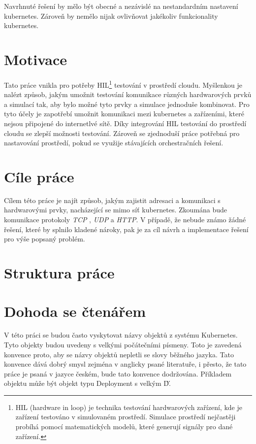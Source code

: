 Navrhnuté řešení by mělo být obecné a nezávislé na nestandardním nastavení kubernetes. Zároveň by nemělo nijak ovlivňovat jakékoliv funkcionality kubernetes. 

\newpage

\section{Motivace}
Tato práce vnikla pro potřeby HIL\footnote{HIL (hardware in loop) je technika testování hardwarových zařízení, kde je zařízení testováno v simulovaném prostředí. Simulace prostředí nejčastěji probíhá pomocí matematických modelů, které generují signály pro dané zařízení.\cite{a2022_what}} testování v prostředí cloudu. Myšlenkou je nalézt způsob, jakým umožnit testování komunikace různých hardwarových prvků a simulací tak, aby bylo možné tyto prvky a simulace jednoduše kombinovat. Pro tyto účely je zapotřebí umožnit komunikaci mezi kubernetes a zařízeními, které nejsou připojené do internetlvé sítě. Díky integrování HIL testování do prostředí cloudu se zlepší možnosti testování. Zároveň se zjednoduší práce potřebná pro nastavování prostředí, pokud se využije stávajících orchestračních řešení.

\section{Cíle práce}
Cílem této práce je najít způsob, jakým zajistit adresaci a komunikaci s hardwarovými prvky, nacházející se mimo síť kubernetes. Zkoumána bude komunikace protokoly \textit{TCP} , \textit{UDP} a \textit{HTTP}. V případě, že nebude známo žádné řešení, které by splnilo kladené nároky, pak je za cíl návrh a implementace řešení pro výše popsaný problém.

\section{Struktura práce}
\lipsum[1]
\section{Dohoda se čtenářem}
V této práci se budou často vyskytovat názvy objektů z systému Kubernetes. Tyto objekty budou uvedeny s velkými počátečními písmeny. Toto je zavedená konvence proto, aby se názvy objektů nepletli se slovy běžného jazyka. Tato konvence dává dobrý smysl zejména v anglicky psané literatuře, i přesto, že tato práce je psaná v jazyce českém, bude tato konvence dodržována. Příkladem objektu může být objekt typu Deployment s velkým \'D\'.

